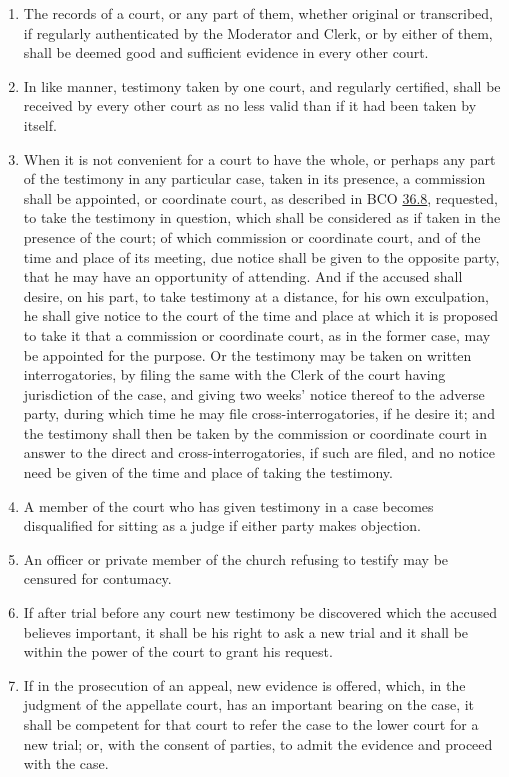 \documentclass[
]{book}
\begin{document}
\begin{enumerate}
\item
  The records of a court, or any part of them, whether original or transcribed, if regularly authenticated by the Moderator and Clerk, or by either of them, shall be deemed good and sufficient evidence in every other court.
\item
  In like manner, testimony taken by one court, and regularly certified, shall be received by every other court as no less valid than if it had been taken by itself.
\item
  When it is not convenient for a court to have the whole, or perhaps any part of the testimony in any particular case, taken in its presence, a commission shall be appointed, or coordinate court, as described in BCO \protect\hyperlink{36.8}{36.8}, requested, to take the testimony in question, which shall be considered as if taken in the presence of the court; of which commission or coordinate court, and of the time and place of its meeting, due notice shall be given to the opposite party, that he may have an opportunity of attending. And if the accused shall desire, on his part, to take testimony at a distance, for his own exculpation, he shall give notice to the court of the time and place at which it is proposed to take it that a commission or coordinate court, as in the former case, may be appointed for the purpose. Or the testimony may be taken on written interrogatories, by filing the same with the Clerk of the court having jurisdiction of the case, and giving two weeks' notice thereof to the adverse party, during which time he may file cross-interrogatories, if he desire it; and the testimony shall then be taken by the commission or coordinate court in answer to the direct and cross-interrogatories, if such are filed, and no notice need be given of the time and place of taking the testimony.
\item
  A member of the court who has given testimony in a case becomes disqualified for sitting as a judge if either party makes objection.
\item
  An officer or private member of the church refusing to testify may be censured for contumacy.
\item
  If after trial before any court new testimony be discovered which the accused believes important, it shall be his right to ask a new trial and it shall be within the power of the court to grant his request.
\item
  \protect\hypertarget{39.14}{\href{}{}}If in the prosecution of an appeal, new evidence is offered, which, in the judgment of the appellate court, has an important bearing on the case, it shall be competent for that court to refer the case to the lower court for a new trial; or, with the consent of parties, to admit the evidence and proceed with the case.
\end{enumerate}
\end{document}
